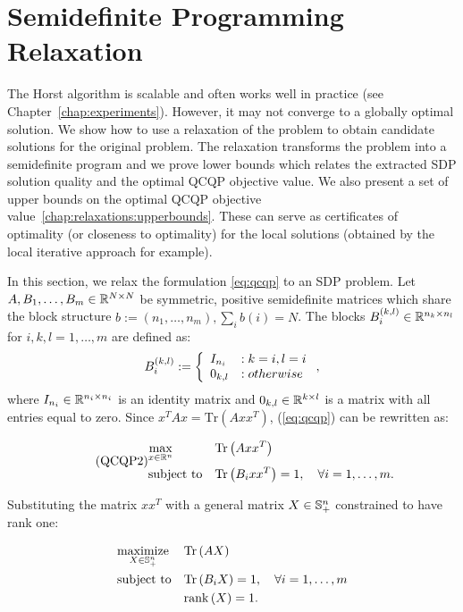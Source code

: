 \section{Semidefinite Programming Relaxation}\label{chap:relaxations:sdp}
The Horst algorithm is scalable and often works well in
practice (see Chapter~\ref{chap:experiments}).
However, it may not converge to a globally optimal
solution. We show how to use a relaxation of the problem to obtain
candidate solutions for the original problem. The relaxation
transforms the problem into a  semidefinite program and we
prove  lower bounds which relates the extracted SDP solution 
quality and the optimal QCQP objective value. We also present 
a set of upper bounds on the optimal QCQP objective value~\ref{chap:relaxations:upperbounds}.
These can serve as certificates of optimality (or closeness to
optimality) for the local solutions (obtained by the local iterative approach for example).

In this section, we relax the formulation \ref{eq:qcqp} to an SDP problem.
Let $A, B_1, \ldots, B_m  \in \mathbb{R}^{N \times N}$ be symmetric, positive semidefinite matrices 
which share the block structure $b := \left(n_1, \ldots, n_m\right), \sum_i b\left(i\right) = N$.
The blocks $B_i^{(k,l)} \in \mathbb{R}^{n_k \times n_l}$ for $i,k,l = 1,\ldots,m$ are defined as:
$$
B_i^{(k,l)} := \left\{
     \begin{array}{l l}
       I_{n_i} & : k = i, l = i\\
       0_{k,l} & : otherwise
     \end{array}
   \right.,
$$
where $I_{n_i} \in \mathbb{R}^{n_i \times n_i}$ is an identity matrix and $0_{k,l} \in \mathbb{R}^{k \times l}$ is 
a matrix with all entries equal to zero. Since $x^T A x = \mathrm{Tr}\left( A x x^T\right)$, (\ref{eq:qcqp})
can be rewritten as:

\begin{equation}\label{eq:qcqp2}
\tag{QCQP2}
\begin{aligned}
& \underset{x \in \mathbb{R}^n}{\text{max}}
& &\mathrm{Tr}\left(A x x^T\right) \\
& \text{subject to}
& &\mathrm{Tr}\left(B_i x x^T\right) = 1,  \quad\forall i =1,\ldots,m.\\
\end{aligned}
\end{equation}

Substituting the matrix $x x^T$ with a general matrix $X \in \mathbb{S}_{+}^{n}$ constrained to have rank one:

\begin{equation*}
\begin{aligned}
& \underset{X \in \mathbb{S}_{+}^n}{\text{maximize}}
& &\mathrm{Tr}\left(A X\right) \\
& \text{subject to}
& &\mathrm{Tr}\left(B_i X\right) = 1,  \quad\forall i =1,\ldots,m\\
& & &\mathrm{rank}\left(X\right) = 1.
\end{aligned}
\end{equation*}

